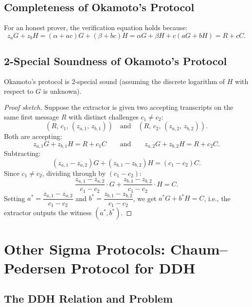 \documentclass[11pt]{article}
\begin{document}
\subsection{Completeness of Okamoto's Protocol}

For an honest prover, the verification equation holds because:
\[
  z_a G + z_b H
  = (\alpha + ac)G + (\beta + bc)H
  = \alpha G + \beta H + c(aG + bH)
  = R + cC.
\]

\subsection{2-Special Soundness of Okamoto's Protocol}

\begin{theorem}
Okamoto's protocol is 2-special sound (assuming the discrete logarithm of $H$ with respect to $G$ is unknown).
\end{theorem}

\begin{proof}[Proof sketch]
Suppose the extractor is given two accepting transcripts on the same first message $R$ with distinct challenges $c_1 \neq c_2$:
\[
  (R,\, c_1,\, (z_{a,1},\, z_{b,1})) \quad \text{and} \quad (R,\, c_2,\, (z_{a,2},\, z_{b,2})).
\]
Both are accepting:
\[
  z_{a,1}G + z_{b,1}H = R + c_1 C
  \qquad\text{and}\qquad
  z_{a,2}G + z_{b,2}H = R + c_2 C.
\]
Subtracting:
\[
  (z_{a,1} - z_{a,2})G + (z_{b,1} - z_{b,2})H = (c_1 - c_2)C.
\]
Since $c_1 \neq c_2$, dividing through by $(c_1 - c_2)$:
\[
  \frac{z_{a,1} - z_{a,2}}{c_1 - c_2}\cdot G + \frac{z_{b,1} - z_{b,2}}{c_1 - c_2}\cdot H = C.
\]
Setting $a^* = \dfrac{z_{a,1} - z_{a,2}}{c_1 - c_2}$ and $b^* = \dfrac{z_{b,1} - z_{b,2}}{c_1 - c_2}$, we get $a^*G + b^*H = C$, i.e., the extractor outputs the witness $(a^*, b^*)$.
\end{proof}

\section{Other Sigma Protocols: Chaum--Pedersen Protocol for DDH}

\subsection{The DDH Relation and Problem}
\end{document}
